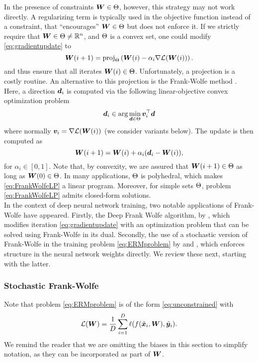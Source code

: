 In the presence of constraints ${\bm{W}} \in \Theta$, however, this strategy may not work directly. A regularizing term is typically used in the objective function instead of a constraint, that ``encourages'' ${\bm{W}} \in \Theta$ but does not enforce it. If we strictly require that ${\bm{W}} \in \Theta \neq \mathbb{R}^n$, and $\Theta$ is a convex set, one could modify \eqref{eq:gradientupdate} to
%
\begin{equation}\label{eq:projectionphi}
{\bm{W}}(i+1) = \text{proj}_{\Theta} \left( {\bm{W}}(i) - \alpha_i \nabla \mathcal{L}({\bm{W}}(i)) \right).    
\end{equation}
%
and thus ensure that all iterates ${\bm{W}}(i) \in \Theta$. Unfortunately, a projection is a costly routine. An alternative to this projection is the Frank-Wolfe method \citep{frank1956algorithm}. Here, a direction ${\bm{d}}_i$ is computed via the following linear-objective convex optimization problem
%
\begin{equation}
    \label{eq:FrankWolfeLP}
    {\bm{d}}_i \in \arg\min_{{\bm{d}} \in \Theta} {\bm{v}}_i^\top {\bm{d}}
\end{equation}
%
where normally ${\bm{v}}_i = \nabla \mathcal{L}({\bm{W}}(i))$ (we consider variants below). The update is then computed as
%
\begin{equation}\label{eq:FrankWolfeUpdate}
{\bm{W}}(i+1) = {\bm{W}}(i) + \alpha_i ({\bm{d}}_i - {\bm{W}}(i)),
\end{equation}
%
for $\alpha_i\in [0,1]$. Note that, by convexity, we are assured that ${\bm{W}}(i+1) \in \Theta$ as long as ${\bm{W}}(0)\in \Theta$. In many applications, $\Theta$ is polyhedral, which makes \eqref{eq:FrankWolfeLP} a linear program. Moreover, for simple sets $\Theta$, problem \eqref{eq:FrankWolfeLP} admits closed-form solutions.\\

In the context of deep neural network training, two notable applications of Frank-Wolfe have appeared. Firstly, the Deep Frank Wolfe algorithm, by  \cite{berrada2018deep}, which modifies iteration \eqref{eq:gradientupdate} with an optimization problem that can be solved using Frank-Wolfe in its dual. Secondly, the use of a stochastic version of Frank-Wolfe in the training problem \eqref{eq:ERMproblem} by \cite{pokutta2020deep} and \cite{xie2020efficient}, which enforces structure in the neural network weights directly. We review these next, starting with the latter.

\subsubsection{Stochastic Frank-Wolfe}
Note that problem \eqref{eq:ERMproblem} is of the form \eqref{eq:unconstrained} with
\[\mathcal{L}({\bm{W}}) = \frac{1}{D} \sum_{i=1}^D \ell(f(\tilde{{\bm{x}}}_i, {\bm{W}}), \tilde{{\bm{y}}}_i).  \]
%
We remind the reader that we are omitting the biases in this section to simplify notation, as they can be incorporated as part of ${\bm{W}}$.

